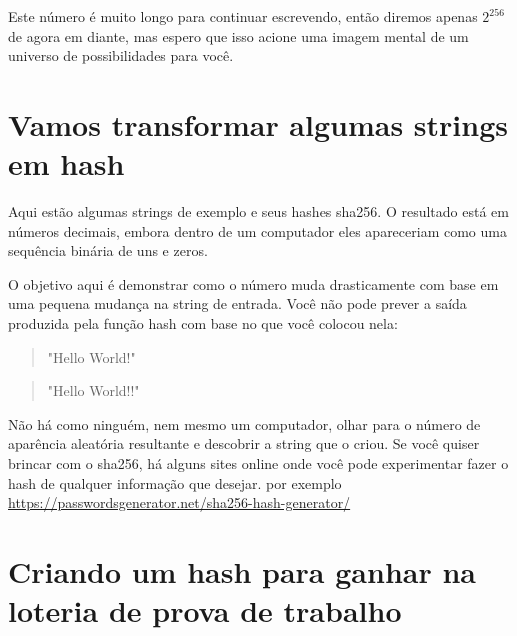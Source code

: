 Este número é muito longo para continuar escrevendo, então diremos apenas \(2^{256}\) de agora em diante, mas espero que isso acione uma imagem mental de um universo de possibilidades para você.

\section*{Vamos transformar algumas strings em hash}

Aqui estão algumas strings de exemplo e seus hashes sha256. O resultado está em números decimais, embora dentro de um computador eles apareceriam como uma sequência binária de uns e zeros.

O objetivo aqui é demonstrar como o número muda drasticamente com base em uma pequena mudança na string de entrada. Você não pode prever a saída produzida pela função hash com base no que você colocou nela:


\begin{quote}{"Hello World!"\newline
}\end{quote}


\begin{samepage}
\begin{quote}{"Hello World!!"\newline
}\end{quote}
\end{samepage}

Não há como ninguém, nem mesmo um computador, olhar para o número de aparência aleatória resultante e descobrir a string que o criou. Se você quiser brincar com o sha256, há alguns sites online onde você pode experimentar fazer o hash de qualquer informação que desejar. por exemplo \url{https://passwordsgenerator.net/sha256-hash-generator/}

\section*{Criando um hash para ganhar na loteria de prova de trabalho}
 
